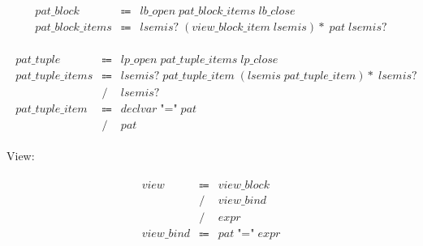 \begin{align*}
    \begin{array}{rcll}
        \mathit{pat\_block}
        &\Coloneq &\mathit{lb\_open}\; \mathit{pat\_block\_items}\; \mathit{lb\_close} \\
        \mathit{pat\_block\_items}
        &\Coloneq &\mathit{lsemis}{?}\; (\mathit{view\_block\_item}\; \mathit{lsemis}){*}\; \mathit{pat}\; \mathit{lsemis}{?}
    \end{array}
\end{align*}

\begin{align*}
    \begin{array}{rcll}
        \mathit{pat\_tuple}
        &\Coloneq &\mathit{lp\_open}\; \mathit{pat\_tuple\_items}\; \mathit{lp\_close} \\
        \mathit{pat\_tuple\_items}
        &\Coloneq &\mathit{lsemis}{?}\; \mathit{pat\_tuple\_item}\; (\mathit{lsemis}\; \mathit{pat\_tuple\_item}){*}\; \mathit{lsemis}{?} \\
        &\mathrel{/} &\mathit{lsemis}{?} \\
        \mathit{pat\_tuple\_item}
        &\Coloneq &\mathit{declvar}\; \texttt{"="}\; \mathit{pat} \\
        &\mathrel{/} &\mathit{pat}
    \end{array}
\end{align*}

View:

\begin{align*}
    \begin{array}{rcll}
        \mathit{view}
        &\Coloneq &\mathit{view\_block} \\
        &\mathrel{/} &\mathit{view\_bind} \\
        &\mathrel{/} &\mathit{expr} \\
        \mathit{view\_bind}
        &\Coloneq &\mathit{pat}\; \texttt{"="}\; \mathit{expr}
    \end{array}
\end{align*}

